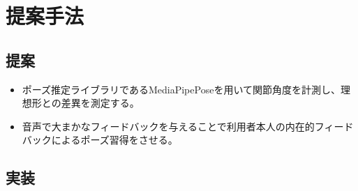 \chapter{提案手法}
\label{proposed}
\section{提案}
\begin{itemize}
  \item ポーズ推定ライブラリであるMediaPipePose\cite{mediapipe_pose_landmarker}を用いて関節角度を計測し、理想形との差異を測定する。
  \item 音声で大まかなフィードバックを与えることで利用者本人の内在的フィードバックによるポーズ習得をさせる。
\end{itemize}

\section{実装}



